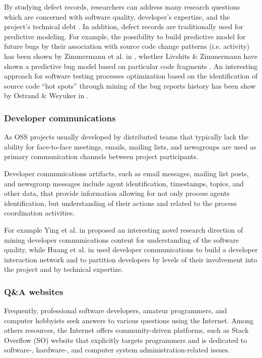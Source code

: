 By studying defect records, researchers can address many research questions which are concerned with software quality,
developer's expertize, and the project's technical debt \cite{citeulike:12550438}. 
In addition, defect records are traditionally used for predictive modeling.
For example, the possibility to build predictive model for future bugs by their association with source code change patterns 
(i.e. activity) has been shown by Zimmermann et al. in \cite{citeulike:6055293}, whether Livshits \& Zimmermann 
have shown a predictive bug model based on particular code fragments \cite{citeulike:393158}. 
An interesting approach for software testing processes optimization based on the identification of source code 
``hot spots'' through mining of the bug reports history has been show by Ostrand \& Weyuker in \cite{ostrand2004tool}.

\subsubsection{Developer communications}
As OSS projects usually developed by distributed teams that typically lack the ability for face-to-face meetings, 
emails, mailing lists, and newsgroups are used as primary communication channels between project participants. 

Developer communications artifacts, such as email messages, mailing list posts, and newsgroup messages include 
agent identification, timestamps, topics, and other data, that provide information allowing for not only process agents 
identification, but understanding of their actions and related to the process coordination activities. 


For example Ying et al. in \cite{citeulike:1366052} proposed an interesting novel research direction of mining developer 
communications content for understanding of the software quality, while Huang et al. in \cite{citeulike:9495129} used developer 
communications to build a developer interaction network and to partition developers by levels of their involvement into the 
project and by technical expertize.

\subsubsection{Q\&A websites}
Frequently, professional software developers, amateur programmers, and computer hobbyists seek answers to various questions 
using the Internet. 
Among others resources, the Internet offers com\-munity-driven platforms, such as Stack Overflow (SO) website that explicitly 
targets programmers and is dedicated to software-, hardware-, and computer system administration-related issues.

